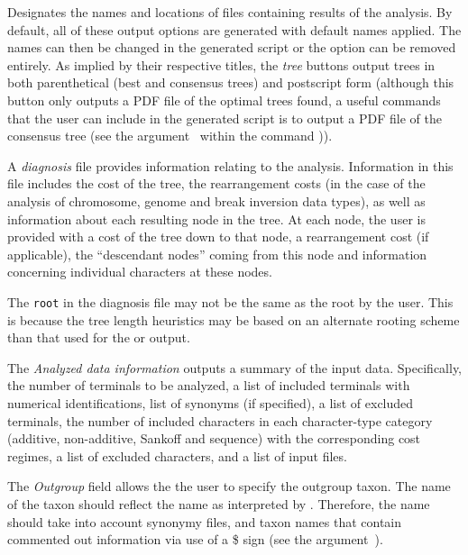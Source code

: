 \begin{description}
\setlength{\parindent}{0.5cm}	   
\item[Output Files]
Designates the names and locations of files containing results of
the analysis.  By default, all of these output options are generated
with default names applied.  The names can then be changed in the
generated script or the option can be removed entirely.  As implied
by their respective titles, the \emph{tree} buttons output trees
in both parenthetical (best and consensus trees) and postscript
form (although this button only outputs a PDF file of the optimal
trees found, a useful commands that the user can include in the
generated script is to output a PDF file of the consensus tree (see
the argument~ within the
command )).

\indent A \emph{diagnosis} file provides information relating to
the analysis. Information in this file includes the cost of the
tree, the rearrangement costs (in the case of the analysis of
chromosome, genome and break inversion data types), as well as
information about each resulting node in the tree.  At each node,
the user is provided with a cost of the tree down to that node, a
rearrangement cost (if applicable), the ``descendant nodes'' coming
from this node and information concerning individual characters at
these nodes.

\begin{statement} The \texttt{root} in the diagnosis file may not
be the same as the root  by the user.  This is
because the tree length heuristics may be based on an alternate
rooting scheme than that used for the  or
 output.  \end{statement}

\indent The \emph{Analyzed data information} outputs a summary of
the input data. Specifically, the number of terminals to be analyzed,
a list of included terminals with numerical identifications, list
of synonyms (if specified), a list of excluded terminals, the number
of included characters in each character-type category (additive,
non-additive, Sankoff and sequence) with the corresponding cost
regimes, a list of excluded characters, and a list of input files.

\indent The \emph{Outgroup} field allows the the user to specify
the outgroup taxon.  The name of the taxon should reflect the name
as interpreted by \poy.  Therefore, the name should take into account
synonymy files, and taxon names that contain commented out information
via use of a \$ sign (see the argument~).
\end{description}

